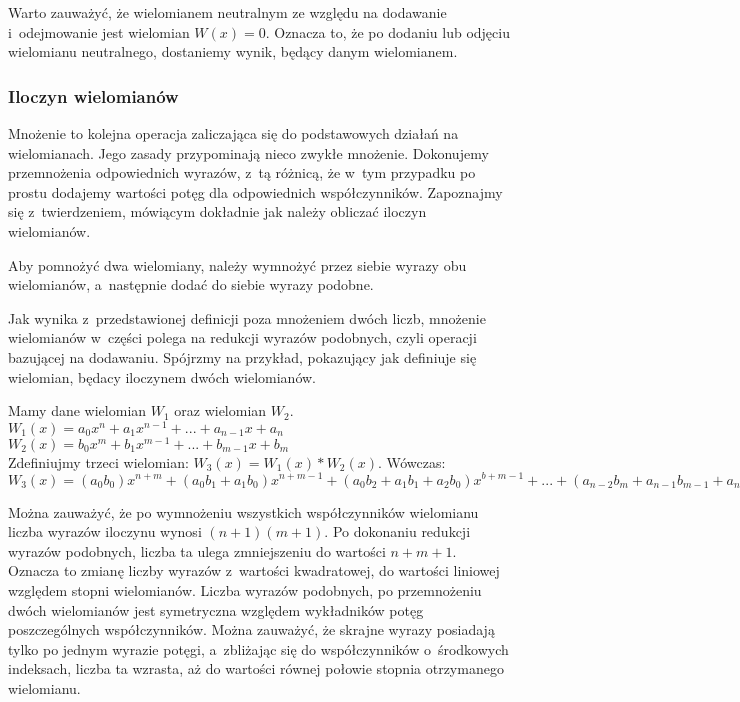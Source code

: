 Warto zauważyć, że wielomianem neutralnym ze względu na dodawanie i~odejmowanie jest wielomian $W(x)=0$. Oznacza to, że po dodaniu lub odjęciu wielomianu neutralnego, dostaniemy wynik, będący danym wielomianem.

\subsubsection{Iloczyn wielomianów}

Mnożenie to kolejna operacja zaliczająca się do podstawowych działań na wielomianach. Jego zasady przypominają nieco zwykłe mnożenie. Dokonujemy przemnożenia odpowiednich wyrazów, z~tą różnicą, że w~tym przypadku po prostu dodajemy wartości potęg dla odpowiednich współczynników. Zapoznajmy się z~twierdzeniem, mówiącym dokładnie jak należy obliczać iloczyn wielomianów.

\begin{theorem}
	$ $\\
	Aby pomnożyć dwa wielomiany, należy wymnożyć przez siebie wyrazy obu wielomianów, a~następnie dodać do siebie wyrazy podobne.
\end{theorem}

Jak wynika z~przedstawionej definicji poza mnożeniem dwóch liczb, mnożenie wielomianów w~części polega na redukcji wyrazów podobnych, czyli operacji bazującej na dodawaniu. Spójrzmy na przykład, pokazujący jak definiuje się wielomian, będacy iloczynem dwóch wielomianów.

\begin{example}
	$ $\\
	Mamy dane wielomian $W_1$ oraz wielomian $W_2$. \\
	$W_1(x) = a_0x^n + a_1x^{n-1} + ... + a_{n-1}x + a_n$ \\
	$W_2(x) = b_0x^m + b_1x^{m-1} + ... + b_{m-1}x + b_m$ \\
	Zdefiniujmy trzeci wielomian: $W_3(x) = W_1(x) * W_2(x)$. Wówczas: \\
	$W_3(x) = (a_0b_0)x^{n+m} + (a_0b_1+a_1b_0)x^{n+m-1} + (a_0b_2+a_1b_1+a_2b_0)x^{b+m-1} + ... + (a_{n-2}b_m+a_{n-1}b_{m-1}+a_nb_{m-2})x^2 + (a_{n-1}b_m + a_nb_{m-1})x + a_nb_m$
\end{example}

Można zauważyć, że po wymnożeniu wszystkich współczynników wielomianu liczba wyrazów iloczynu wynosi $(n+1)(m+1)$. Po dokonaniu redukcji wyrazów podobnych, liczba ta ulega zmniejszeniu do wartości $n+m+1$. Oznacza to zmianę liczby wyrazów z~wartości kwadratowej, do wartości liniowej względem stopni wielomianów. Liczba wyrazów podobnych, po przemnożeniu dwóch wielomianów jest symetryczna względem wykładników potęg poszczególnych współczynników. Można zauważyć, że skrajne wyrazy posiadają tylko po jednym wyrazie potęgi, a~zbliżając się do współczynników o~środkowych indeksach, liczba ta wzrasta, aż do wartości równej połowie stopnia otrzymanego wielomianu.

